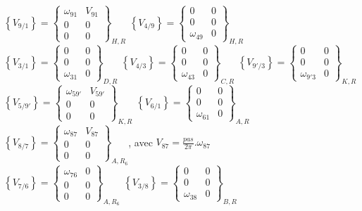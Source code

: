 $\left\{V_{9/1}\right\}=
\left\{\begin{array}{cc}
\omega_{91} & V_{91} \\
0 & 0 \\
0 & 0
\end{array}\right\}_{H,R}$
$\left\{V_{4/9}\right\}=
\left\{\begin{array}{cc}
0 & 0 \\
0 & 0 \\
\omega_{49} & 0
\end{array}\right\}_{H,R}$
$\left\{V_{3/1}\right\}=
\left\{\begin{array}{cc}
0 & 0 \\
0 & 0 \\
\omega_{31} & 0
\end{array}\right\}_{D,R}$
$\left\{V_{4/3}\right\}=
\left\{\begin{array}{cc}
0 & 0 \\
0 & 0 \\
\omega_{43} & 0
\end{array}\right\}_{C,R}$
$\left\{V_{9'/3}\right\}=
\left\{\begin{array}{cc}
0 & 0 \\
0 & 0 \\
\omega_{9'3} & 0
\end{array}\right\}_{K,R}$
$\left\{V_{5/9'}\right\}=
\left\{\begin{array}{cc}
\omega_{59'} & V_{59'} \\
0 & 0 \\
0 & 0
\end{array}\right\}_{K,R}$
$\left\{V_{6/1}\right\}=
\left\{\begin{array}{cc}
0 & 0 \\
0 & 0 \\
\omega_{61} & 0
\end{array}\right\}_{A,R}$
$\left\{V_{8/7}\right\}=
\left\{\begin{array}{cc}
\omega_{87} & V_{87} \\
0 & 0 \\
0 & 0
\end{array}\right\}_{A,R_6}$, avec $V_{87}=\frac{pas}{2\pi}.\omega_{87}$ \\
$\left\{V_{7/6}\right\}=
\left\{\begin{array}{cc}
\omega_{76} & 0 \\
0 & 0 \\
0 & 0
\end{array}\right\}_{A,R_6}$
$\left\{V_{3/8}\right\}=
\left\{\begin{array}{cc}
0 & 0 \\
0 & 0 \\
\omega_{38} & 0
\end{array}\right\}_{B,R}$

